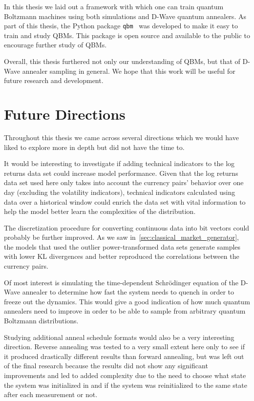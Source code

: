 In this thesis we laid out a framework with which one can train quantum Boltzmann machines using both simulations and D-Wave quantum annealers.
As part of this thesis, the Python package \texttt{qbm}~\cite{qbm} was developed to make it easy to train and study QBMs.
This package is open source and available to the public to encourage further study of QBMs.

Overall, this thesis furthered not only our understanding of QBMs, but that of D-Wave annealer sampling in general.
We hope that this work will be useful for future research and development.

\section{Future Directions}
Throughout this thesis we came across several directions which we would have liked to explore more in depth but did not have the time to.

It would be interesting to investigate if adding technical indicators to the log returns data set could increase model performance.
Given that the log returns data set used here only takes into account the currency pairs' behavior over one day (excluding the volatility indicators), technical indicators calculated using data over a historical window could enrich the data set with vital information to help the model better learn the complexities of the distribution.

The discretization procedure for converting continuous data into bit vectors could probably be further improved.
As we saw in~\cref{sec:classical_market_generator}, the models that used the outlier power-transformed data sets generate samples with lower KL divergences and better reproduced the correlations between the currency pairs.

Of most interest is simulating the time-dependent Schr\"odinger equation of the D-Wave annealer to determine how fast the system needs to quench in order to freeze out the dynamics.
This would give a good indication of how much quantum annealers need to improve in order to be able to sample from arbitrary quantum Boltzmann distributions.

Studying additional anneal schedule formats would also be a very interesting direction.
Reverse annealing was tested to a very small extent here only to see if it produced drastically different results than forward annealing, but was left out of the final research because the results did not show any significant improvements and led to added complexity due to the need to choose what state the system was initialized in and if the system was reinitialized to the same state after each measurement or not.
